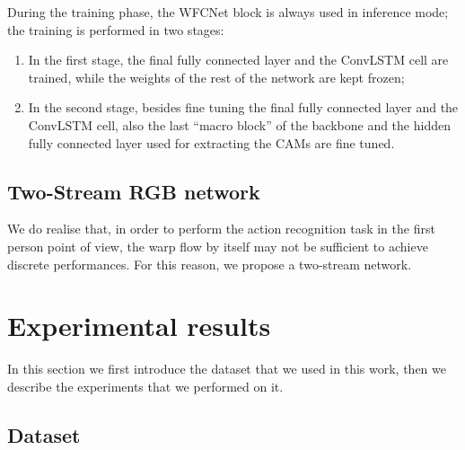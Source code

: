 \documentclass[10pt,twocolumn,letterpaper]{article}
\begin{document}
During the training phase, the WFCNet block is always used in inference mode; the training is performed in two stages:
\begin{enumerate}
	\item In the first stage, the final fully connected layer and the ConvLSTM cell are trained, while the weights of the rest of the network are kept frozen;
	\item In the second stage, besides fine tuning the final fully connected layer and the ConvLSTM cell, also the last ``macro block'' of the backbone and the hidden fully connected layer used for extracting the CAMs are fine tuned.
\end{enumerate}

\subsection{Two-Stream RGB network}


We do realise that, in order to perform the action recognition task in the first person point of view, the warp flow by itself may not be sufficient to achieve discrete performances. For this reason, we propose a two-stream network.

\section{Experimental results}

In this section we first introduce the dataset that we used in this work, then we describe the experiments that we performed on it.

\subsection{Dataset}
\end{document}
